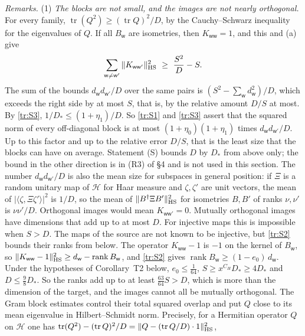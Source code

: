 \documentclass[11pt,letterpaper]{article}
\begin{document}
\emph{Remarks.} (1) \emph{The blocks are not small, and the images are not nearly orthogonal.} For every
family, $\operatorname{tr}(Q^2)\ge(\operatorname{tr}Q)^2/D$, by the Cauchy--Schwarz inequality for the
eigenvalues of $Q$. If all $B_{\mathsf w}$ are isometries, then $K_{\mathsf w\mathsf w}=1$, and this and (a) give
\begin{equation}\label{D:309}
 \sum_{\mathsf w\ne\mathsf w'}\|K_{\mathsf w\mathsf w'}\|_{\rm HS}^2\ \ge\ \frac{S^2}D-S .
\end{equation}
The sum of the bounds $d_{\mathsf w}d_{\mathsf w'}/D$ over the same pairs is $(S^2-\sum_{\mathsf w}d_{\mathsf w}^2)/D$,
which exceeds the right side by at most $S$, that is, by the relative amount $D/S$ at most. By \eqref{tr:S3}, $1/D_*\le(1+\eta_1)/D$. So \eqref{tr:S1} and \eqref{tr:S3} assert that the squared norm of
every off-diagonal block is at most $(1+\eta_0)(1+\eta_1)$ times $d_{\mathsf w}d_{\mathsf w'}/D$. Up to this
factor and up to the relative error $D/S$, that is the least size that the blocks can have on average.
Statement (S) bounds $D$ by $D_*$ from above only; the bound in the other direction is in (R3) of \S4 and is
not used in this section. The number $d_{\mathsf w}d_{\mathsf w'}/D$ is also the mean size for subspaces in
general position: if $\Xi$ is a random unitary map of $\mathcal H$ for Haar measure and $\zeta,\zeta'$ are unit
vectors, the mean of $|\langle\zeta,\Xi\zeta'\rangle|^2$ is $1/D$, so the mean of $\|B^\dagger\Xi B'\|_{\rm HS}^2$ for
isometries $B,B'$ of ranks $\nu,\nu'$ is $\nu\nu'/D$. Orthogonal images would mean
$K_{\mathsf w\mathsf w'}=0$. Mutually orthogonal images have dimensions that add up to at most $D$. For
injective maps this is impossible when $S>D$. The maps of the source are not known to be injective, but
\eqref{tr:S2} bounds their ranks from below. The operator $K_{\mathsf w\mathsf w}-1$ is $-1$ on the kernel of
$B_{\mathsf w}$, so $\|K_{\mathsf w\mathsf w}-1\|_{\rm HS}^2\ge d_{\mathsf w}-\operatorname{rank}B_{\mathsf w}$, and
\eqref{tr:S2} gives $\operatorname{rank}B_{\mathsf w}\ge(1-e_0)\,d_{\mathsf w}$. Under the hypotheses of
Corollary~T2 below, $e_0\le\frac1{64}$, $S\ge x^{C_H}D_*\ge4D_*$ and $D\le\frac98D_*$. So the ranks add up to
at least $\frac{63}{64}S>D$, which is more than the dimension of the target, and the images cannot all be
mutually orthogonal. The Gram block estimates control their total squared overlap
and put $Q$ close to its mean eigenvalue in Hilbert--Schmidt norm. Precisely, for a Hermitian operator $Q$ on
$\mathcal H$ one has $\operatorname{tr}(Q^2)-(\operatorname{tr}Q)^2/D=\|Q-(\operatorname{tr}Q/D)\cdot1\|_{\rm HS}^2$,
\end{document}
